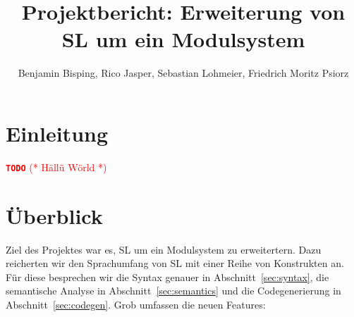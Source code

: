 \documentclass[runningheads]{llncs}
\author{Benjamin Bisping, Rico Jasper, Sebastian Lohmeier,
	Friedrich Moritz Psiorz}
\title{Projektbericht: Erweiterung von SL um ein Modulsystem}
\institute{Compilerbauprojekt SoSe 2013, Technische Universität Berlin}
\newcommand{\TODO}[1]{ \textcolor{red}{\textbf{\texttt{\large{TODO}}} (* #1 *)}\par}
\begin{document}
\def\open{\texttt{(}}
\def\close{\texttt{)}}
\def\bropen{\texttt{\{}}
\def\brclose{\texttt{\}}}
\def\sqopen{\texttt{[}}
\def\sqclose{\texttt{]}}
\def\squote{\texttt{'}}
\def\dquote{\texttt{''}}
\def\eq{\texttt{=}}
\def\colon{\texttt{:}}
\def\lam{\mbox{\texttt{\BackslashTT}}}
\def\bar{\texttt{|}}
\def\comma{\texttt{,}}
\def\arrow{\texttt{->}}

\def\addint{\texttt{+}}
\def\subint{\texttt{-}}
\def\mulint{\texttt{*}}
\def\divint{\texttt{/}}

\def\ltint{\texttt{<}}
\def\leint{\texttt{<=}}
\def\eqint{\texttt{==}}
\def\neint{\texttt{/=}}
\def\geint{\texttt{>=}}
\def\gtint{\texttt{>}}

\def\exclamationOp{\texttt{!}}
\def\paragraphOp{\texttt{§}}
\def\percentOp{\texttt{\%}}
\def\ampOp{\texttt{\&}}
\def\questionOp{\texttt{?}}
\def\sharpOp{\texttt{\#}}
\def\pipeOp{\texttt{|}}

\maketitle


\section{Einleitung}

\TODO{Hällü Wörld}

\section{Überblick}

Ziel des Projektes war es, SL um ein Modulsystem zu erweitertern. Dazu
reicherten wir den Sprachumfang von SL mit einer Reihe von Konstrukten an. Für
diese besprechen wir die Syntax genauer in Abschnitt~\ref{sec:syntax},
die semantische Analyse in Abschnitt~\ref{sec:semantics} und die
Codegenerierung in Abschnitt~\ref{sec:codegen}. Grob umfassen die neuen
Features:
\end{document}
